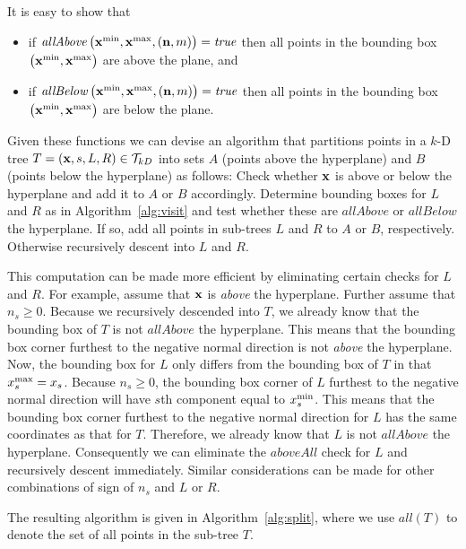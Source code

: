 It is easy to show that
\begin{itemize}
  \item if $\mathit{allAbove} \left( \mathbf{x}^{\operatorname{min}}, \mathbf{x}^{\operatorname{max}}, \left( \mathbf{n}, m \right) \right) = \mathit{true}$
        then all points in the bounding box $\left( \mathbf{x}^{\operatorname{min}}, \mathbf{x}^{\operatorname{max}} \right)$ are above the plane, and
  \item if $\mathit{allBelow} \left( \mathbf{x}^{\operatorname{min}}, \mathbf{x}^{\operatorname{max}}, \left( \mathbf{n}, m \right) \right) = \mathit{true}$
        then all points in the bounding box $\left( \mathbf{x}^{\operatorname{min}}, \mathbf{x}^{\operatorname{max}} \right)$ are below the plane.
\end{itemize}

Given these functions we can devise an algorithm that partitions points in a $k$-D tree $T = \left( \mathbf{x}, s, L, R \right) \in \mathcal{T}_{kD}$
  into sets $A$ (points above the hyperplane)
  and $B$ (points below the hyperplane) as follows:
Check whether $\mathbf{x}$ is above or below the hyperplane and add it to $A$ or $B$ accordingly.
Determine bounding boxes for $L$ and $R$ as in Algorithm~\ref{alg:visit}
  and test whether these are $\mathit{allAbove}$ or $\mathit{allBelow}$ the hyperplane.
If so, add all points in sub-trees $L$ and $R$ to $A$ or $B$, respectively.
Otherwise recursively descent into $L$ and $R$.

This computation can be made more efficient by eliminating certain checks for $L$ and $R$.
For example, assume that $\mathbf{x}$ is \emph{above} the hyperplane.
Further assume that $n_s \geq 0$.
Because we recursively descended into $T$, we already know that the bounding box of $T$ is not $\mathit{allAbove}$ the hyperplane.
This means that the bounding box corner furthest to the negative normal direction is not \emph{above} the hyperplane.
Now, the bounding box for $L$ only differs from the bounding box of $T$ in that $x^{\operatorname{max}}_{s} = x_s$.
Because $n_s \geq 0$, the bounding box corner of $L$ furthest to the negative normal direction will have $s$th component equal to $x^{\operatorname{min}}_{s}$.
This means that the bounding box corner furthest to the negative normal direction for $L$ has the same coordinates as that for $T$.
Therefore, we already know that $L$ is not $\mathit{allAbove}$ the hyperplane.
Consequently we can eliminate the $\mathit{aboveAll}$ check for $L$ and recursively descent immediately.
Similar considerations can be made for other combinations of sign of $n_s$ and $L$ or $R$.

The resulting algorithm is given in Algorithm~\ref{alg:split},
  where we use $\mathit{all}\left(T\right)$ to denote the set of all points in the sub-tree $T$.

